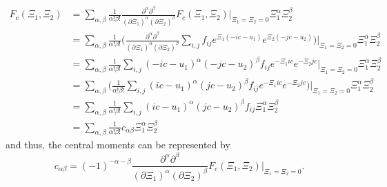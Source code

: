 \begin{equation}
  \label{eq: taylor of Fc}
  \begin{aligned}
    F_c(\Xi_1, \Xi_2) & = \sum_{\alpha,\beta} \frac{1}{\alpha!\beta!} \frac{\partial^\alpha\partial^\beta}{{(\partial \Xi_1)}^\alpha{(\partial \Xi_2)}^\beta} F_c(\Xi_1, \Xi_2)\Bigr|_{\Xi_1=\Xi_2 = 0} \Xi_1^\alpha \Xi_2^\beta \\
    & = \sum_{\alpha,\beta} \frac{1}{\alpha!\beta!} \Bigg(
      \frac{\partial^\alpha\partial^\beta}{{(\partial \Xi_1)}^\alpha{(\partial \Xi_2)}^\beta}
        \sum_{i,j}f_{ij} e^{\Xi_1 (-ic-u_1)} e^{\Xi_2 (-jc-u_2)} \Bigg)\Bigr|_{\Xi_1=\Xi_2 = 0} \Xi_1^\alpha \Xi_2^\beta \\
    & = \sum_{\alpha,\beta} \frac{1}{\alpha!\beta!}
      \sum_{i,j} {(-ic-u_1)}^\alpha {(-jc-u_2)}^\beta f_{ij} e^{-\Xi_1 ic} e^{-\Xi_2 jc} \Bigr|_{\Xi_1=\Xi_2 = 0} \Xi_1^\alpha \Xi_2^\beta \\
    & = \sum_{\alpha,\beta} \Bigg(
        \frac{1}{\alpha!\beta!}
        \sum_{i,j} {\left(ic - u_1\right)}^\alpha {\left(jc - u_2\right)}^\beta f_{ij} e^{-\Xi_1 ic} e^{-\Xi_2 jc}
      \Bigg)\Bigr|_{\Xi_1=\Xi_2 = 0} \Xi_1^\alpha \Xi_2^\beta \\
    & = \sum_{\alpha,\beta} \frac{1}{\alpha!\beta!}
      \sum_{i,j} {\left(ic - u_1\right)}^\alpha {\left(jc - u_2\right)}^\beta f_{ij} \Xi_1^\alpha \Xi_2^\beta \\
    & = \sum_{\alpha,\beta} \frac{1}{\alpha!\beta!} c_{\alpha\beta} \Xi_1^\alpha \Xi_2^\beta
  \end{aligned}
\end{equation}
%
and thus, the central moments can be represented by
\begin{equation}
  \label{eq: alternative representation of central moments}
  c_{\alpha\beta} = {(-1)}^{-\alpha-\beta} \frac{\partial^\alpha\partial^\beta}{{(\partial \Xi_1)}^\alpha{(\partial \Xi_2)}^\beta} F_c(\Xi_1, \Xi_2)\Bigr|_{\Xi_1=\Xi_2 = 0}.
\end{equation}

